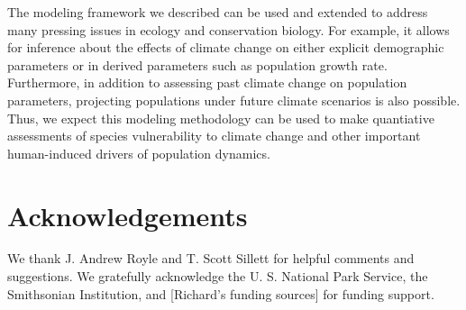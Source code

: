 \documentclass[12pt,english]{article}
\begin{document}
\begin{spacing}{1.9}
\begin{flushleft}
The modeling framework we described can be used and extended to address many
pressing issues in ecology and conservation biology. For
example,
it allows for inference %
about the effects of climate change on either explicit
demographic parameters or in derived parameters such as
population growth rate. Furthermore, %
in addition to assessing past climate change on population
parameters, projecting populations under future climate scenarios is also
possible. Thus, we expect this modeling methodology can be used
to make quantiative assessments of species vulnerability to climate
change and other important human-induced drivers of population
dynamics.


\section*{Acknowledgements}

We thank J. Andrew Royle and T. Scott Sillett for helpful
comments and suggestions. We gratefully acknowledge the U. S. National Park 
Service, the Smithsonian Institution, and [Richard's funding sources] for funding support.




\newpage




\end{flushleft}
\end{spacing}
\end{document}
